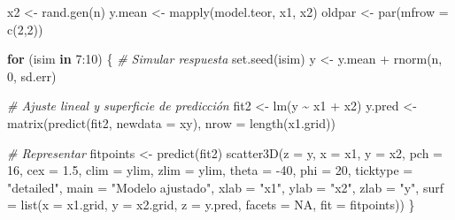 \documentclass[
]{book}
\newenvironment{Shaded}{\begin{snugshade}}{\end{snugshade}}
\newcommand{\AttributeTok}[1]{\textcolor[rgb]{0.77,0.63,0.00}{#1}}
\newcommand{\CommentTok}[1]{\textcolor[rgb]{0.56,0.35,0.01}{\textit{#1}}}
\newcommand{\ConstantTok}[1]{\textcolor[rgb]{0.00,0.00,0.00}{#1}}
\newcommand{\ControlFlowTok}[1]{\textcolor[rgb]{0.13,0.29,0.53}{\textbf{#1}}}
\newcommand{\DecValTok}[1]{\textcolor[rgb]{0.00,0.00,0.81}{#1}}
\newcommand{\FloatTok}[1]{\textcolor[rgb]{0.00,0.00,0.81}{#1}}
\newcommand{\FunctionTok}[1]{\textcolor[rgb]{0.00,0.00,0.00}{#1}}
\newcommand{\NormalTok}[1]{#1}
\newcommand{\OtherTok}[1]{\textcolor[rgb]{0.56,0.35,0.01}{#1}}
\newcommand{\SpecialCharTok}[1]{\textcolor[rgb]{0.00,0.00,0.00}{#1}}
\newcommand{\StringTok}[1]{\textcolor[rgb]{0.31,0.60,0.02}{#1}}
\theoremstyle{break}
\theoremstyle{definition}
\theoremstyle{definition}
\theoremstyle{definition}
\theoremstyle{definition}
\theoremstyle{remark}
\begin{document}
\begin{Shaded}
\begin{Highlighting}[]
\NormalTok{x2 }\OtherTok{\textless{}{-}} \FunctionTok{rand.gen}\NormalTok{(n)}
\NormalTok{y.mean }\OtherTok{\textless{}{-}} \FunctionTok{mapply}\NormalTok{(model.teor, x1, x2)}
\NormalTok{oldpar }\OtherTok{\textless{}{-}} \FunctionTok{par}\NormalTok{(}\AttributeTok{mfrow =} \FunctionTok{c}\NormalTok{(}\DecValTok{2}\NormalTok{,}\DecValTok{2}\NormalTok{))}

\ControlFlowTok{for}\NormalTok{ (isim }\ControlFlowTok{in} \DecValTok{7}\SpecialCharTok{:}\DecValTok{10}\NormalTok{) \{}
  \CommentTok{\# Simular respuesta}
  \FunctionTok{set.seed}\NormalTok{(isim)}
\NormalTok{  y }\OtherTok{\textless{}{-}}\NormalTok{ y.mean }\SpecialCharTok{+} \FunctionTok{rnorm}\NormalTok{(n, }\DecValTok{0}\NormalTok{, sd.err)}
  
  \CommentTok{\# Ajuste lineal y superficie de predicción}
\NormalTok{  fit2 }\OtherTok{\textless{}{-}} \FunctionTok{lm}\NormalTok{(y }\SpecialCharTok{\textasciitilde{}}\NormalTok{ x1 }\SpecialCharTok{+}\NormalTok{ x2)}
\NormalTok{  y.pred }\OtherTok{\textless{}{-}} \FunctionTok{matrix}\NormalTok{(}\FunctionTok{predict}\NormalTok{(fit2, }\AttributeTok{newdata =}\NormalTok{ xy), }\AttributeTok{nrow =} \FunctionTok{length}\NormalTok{(x1.grid)) }
  
  \CommentTok{\# Representar}
\NormalTok{  fitpoints }\OtherTok{\textless{}{-}} \FunctionTok{predict}\NormalTok{(fit2) }
  \FunctionTok{scatter3D}\NormalTok{(}\AttributeTok{z =}\NormalTok{ y, }\AttributeTok{x =}\NormalTok{ x1, }\AttributeTok{y =}\NormalTok{ x2, }\AttributeTok{pch =} \DecValTok{16}\NormalTok{, }\AttributeTok{cex =} \FloatTok{1.5}\NormalTok{, }\AttributeTok{clim =}\NormalTok{ ylim, }\AttributeTok{zlim =}\NormalTok{ ylim,}
            \AttributeTok{theta =} \SpecialCharTok{{-}}\DecValTok{40}\NormalTok{, }\AttributeTok{phi =} \DecValTok{20}\NormalTok{, }\AttributeTok{ticktype =} \StringTok{"detailed"}\NormalTok{, }
            \AttributeTok{main =} \StringTok{"Modelo ajustado"}\NormalTok{, }\AttributeTok{xlab =} \StringTok{"x1"}\NormalTok{, }\AttributeTok{ylab =} \StringTok{"x2"}\NormalTok{, }\AttributeTok{zlab =} \StringTok{"y"}\NormalTok{, }
            \AttributeTok{surf =} \FunctionTok{list}\NormalTok{(}\AttributeTok{x =}\NormalTok{ x1.grid, }\AttributeTok{y =}\NormalTok{ x2.grid, }\AttributeTok{z =}\NormalTok{ y.pred, }
                        \AttributeTok{facets =} \ConstantTok{NA}\NormalTok{, }\AttributeTok{fit =}\NormalTok{ fitpoints))}
\NormalTok{\}}
\end{Highlighting}
\end{Shaded}
\end{document}
